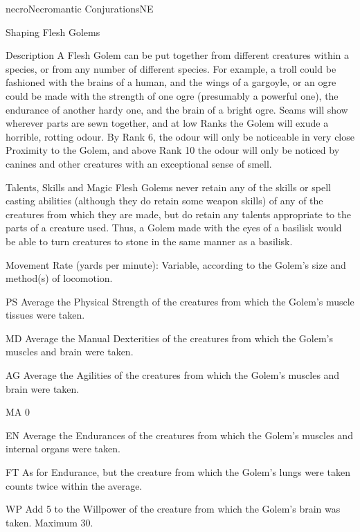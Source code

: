 \begin{college}[1.1]{necro}{Necromantic Conjurations}{NE}
\begin{ritual}[R-4]{Shaping Flesh Golems}
\begin{effects}
\begin{Description}
\item[Description]
  A Flesh Golem can be put together from different creatures within a
species, or from any number of different species.  For example, a
troll could be fashioned with the brains of a human, and the wings of
a gargoyle, or an ogre could be made with the strength of one ogre
(presumably a powerful one), the endurance of another hardy one, and
the brain of a bright ogre.  Seams will show wherever parts are sewn
together, and at low Ranks the Golem will exude a horrible, rotting
odour.  By Rank 6, the odour will only be noticeable in very close
Proximity to the Golem, and above Rank 10 the odour will only be
noticed by canines and other creatures with an exceptional sense of
smell.

\item[Talents, Skills and Magic]
Flesh Golems never retain any of the skills or spell casting abilities
(although they do retain some weapon skills) of any of the creatures
from which they are made, but do retain any talents appropriate to the
parts of a creature used.  Thus, a Golem made with the eyes of a
basilisk would be able to turn creatures to stone in the same manner
as a basilisk.

\item[Movement Rate]
(yards per minute): Variable, according to the Golem's size and
method(s) of locomotion.

\item[PS]
Average the Physical Strength of the creatures from which the Golem's
muscle tissues were taken.

\item[MD]
Average the Manual Dexterities of the creatures from which the Golem's
muscles and brain were taken.

\item[AG]
Average the Agilities of the creatures from which the Golem's muscles
and brain were taken.

\item[MA] 0

\item[EN]
Average the Endurances of the creatures from which the Golem's muscles
and internal organs were taken.

\item[FT]  As  for  Endurance,  but  the  creature   from
which the Golem's lungs were taken counts twice within the average.

\item[WP]
Add 5 to the Willpower of the creature from which the Golem's brain
was taken.  Maximum 30.


\end{Description}
\end{effects}
\end{ritual}
\end{college}
